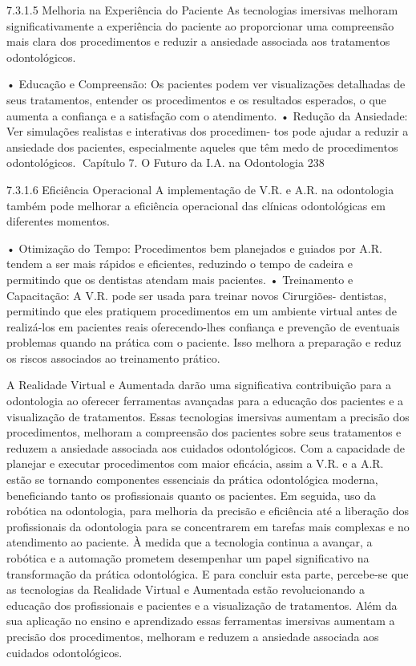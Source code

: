 7.3.1.5   Melhoria na Experiência do Paciente
As tecnologias imersivas melhoram significativamente a experiência do paciente ao
proporcionar uma compreensão mais clara dos procedimentos e reduzir a ansiedade
associada aos tratamentos odontológicos.

    • Educação e Compreensão: Os pacientes podem ver visualizações detalhadas
      de seus tratamentos, entender os procedimentos e os resultados esperados, o
      que aumenta a confiança e a satisfação com o atendimento.
    • Redução da Ansiedade: Ver simulações realistas e interativas dos procedimen-
      tos pode ajudar a reduzir a ansiedade dos pacientes, especialmente aqueles que
      têm medo de procedimentos odontológicos.
Capítulo 7. O Futuro da I.A. na Odontologia                                        238


7.3.1.6   Eficiência Operacional
A implementação de V.R. e A.R. na odontologia também pode melhorar a eficiência
operacional das clínicas odontológicas em diferentes momentos.

    • Otimização do Tempo: Procedimentos bem planejados e guiados por A.R.
      tendem a ser mais rápidos e eficientes, reduzindo o tempo de cadeira e permitindo
      que os dentistas atendam mais pacientes.
    • Treinamento e Capacitação: A V.R. pode ser usada para treinar novos Cirurgiões-
      dentistas, permitindo que eles pratiquem procedimentos em um ambiente virtual
      antes de realizá-los em pacientes reais oferecendo-lhes confiança e prevenção
      de eventuais problemas quando na prática com o paciente. Isso melhora a
      preparação e reduz os riscos associados ao treinamento prático.

         A Realidade Virtual e Aumentada darão uma significativa contribuição para a
odontologia ao oferecer ferramentas avançadas para a educação dos pacientes e a
visualização de tratamentos. Essas tecnologias imersivas aumentam a precisão dos
procedimentos, melhoram a compreensão dos pacientes sobre seus tratamentos e
reduzem a ansiedade associada aos cuidados odontológicos. Com a capacidade de
planejar e executar procedimentos com maior eficácia, assim a V.R. e a A.R. estão se
tornando componentes essenciais da prática odontológica moderna, beneficiando tanto
os profissionais quanto os pacientes.
         Em seguida, uso da robótica na odontologia, para melhoria da precisão e
eficiência até a liberação dos profissionais da odontologia para se concentrarem em
tarefas mais complexas e no atendimento ao paciente. À medida que a tecnologia
continua a avançar, a robótica e a automação prometem desempenhar um papel
significativo na transformação da prática odontológica.
        E para concluir esta parte, percebe-se que as tecnologias da Realidade Virtual
e Aumentada estão revolucionando a educação dos profissionais e pacientes e a
visualização de tratamentos. Além da sua aplicação no ensino e aprendizado essas
ferramentas imersivas aumentam a precisão dos procedimentos, melhoram e reduzem
a ansiedade associada aos cuidados odontológicos.

